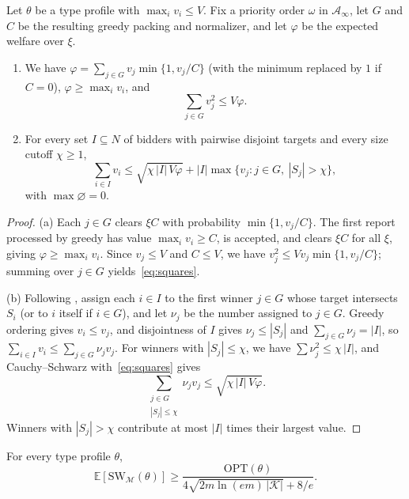 \documentclass[format=acmsmall, review=false]{acmart}
\newcommand{\E}{\mathbb{E}}
\newcommand{\OPT}{\mathrm{OPT}}
\newcommand{\SW}{\mathrm{SW}}
\theoremstyle{acmdefinition}%
\begin{document}
\begin{lemma}
\label{lem:welfare-base}
Let \(\theta\) be a type profile with \(\max_i v_i\le V\). Fix a
priority order \(\omega\) in \(\mathcal A_\infty\), let \(G\) and
\(C\) be the resulting greedy packing and normalizer, and let
\(\varphi\) be the expected welfare over \(\xi\).
\begin{enumerate}
\item[(a)] We have
\(\varphi=\sum_{j\in G}v_j\min\{1,v_j/C\}\) (with the minimum
replaced by \(1\) if \(C=0\)), \(\varphi\ge\max_i v_i\), and
\begin{equation}\label{eq:squares}
\sum_{j\in G}v_j^2\le V\varphi.
\end{equation}
\item[(b)] For every set \(I\subseteq N\) of bidders with pairwise
disjoint targets and every size cutoff \(\chi\ge1\),
\[
\sum_{i\in I}v_i
\le
\sqrt{\chi\,|I|\,V\varphi}
+|I|\max\{v_j:j\in G,\ |S_j|>\chi\},
\]
with \(\max\varnothing=0\).
\end{enumerate}
\end{lemma}

\begin{proof}
(a) Each \(j\in G\) clears \(\xi C\) with probability
\(\min\{1,v_j/C\}\). The first report processed by greedy has
value \(\max_i v_i\ge C\), is accepted, and clears \(\xi C\) for
all \(\xi\), giving \(\varphi\ge\max_i v_i\). Since \(v_j\le V\)
and \(C\le V\), we have \(v_j^2\le Vv_j\min\{1,v_j/C\}\);
summing over \(j\in G\) yields~\eqref{eq:squares}.

(b) Following \citet[Theorem~3]{lehmann2002truth}, assign each
\(i\in I\) to the first winner \(j\in G\) whose target intersects
\(S_i\) (or to \(i\) itself if \(i\in G\)), and let \(\nu_j\) be
the number assigned to \(j\in G\). Greedy ordering gives
\(v_i\le v_j\), and disjointness of \(I\) gives \(\nu_j\le|S_j|\)
and \(\sum_{j\in G}\nu_j=|I|\), so
\(\sum_{i\in I}v_i\le\sum_{j\in G}\nu_j v_j\). For winners with
\(|S_j|\le\chi\), we have \(\sum\nu_j^2\le\chi\,|I|\), and
Cauchy--Schwarz with~\eqref{eq:squares} gives
\[
\sum_{\substack{j\in G\\|S_j|\le\chi}}\nu_j v_j
\le\sqrt{\chi\,|I|\,V\varphi}.
\]
Winners with \(|S_j|>\chi\) contribute at most \(|I|\) times their
largest value.
\end{proof}

\begin{proposition}
\label{prop:welfare}
For every type profile \(\theta\),
\[
\E[\SW_{\mathcal M}(\theta)]
\ge
\frac{\OPT(\theta)}{
4\sqrt{2m\ln(em)\,|\mathcal K|}+8/e}.
\]
\end{proposition}
\end{document}
